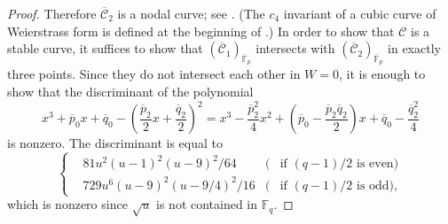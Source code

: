 \documentclass{amsart}
\theoremstyle{definition}
\theoremstyle{remark}
\newcommand{\Fq}{\mathbb F_q}
\newcommand{\Fbar}{\overline{\mathbb F}_p}
\begin{document}
\begin{proof}
Therefore $\overline{\mathscr{C}}_2$ is a nodal curve; see \cite[Chapter III, Proposition 1.4]{Silverman}.
(The $c_4$ invariant of a cubic curve of Weierstrass form is defined at the beginning of \cite[Section III.1]{Silverman}.)
In order to show that $\mathscr{C}$ is a stable curve, it suffices to show that
$(\overline{\mathscr{C}}_1)_{\Fbar}$
intersects
with
$(\overline{\mathscr{C}}_2)_{\Fbar}$
in exactly three points.
Since they do not intersect each other in $W=0$, it is enough to show that
the discriminant of
the polynomial
\begin{equation}\label{equation:intersection}
x^3 + \overline{p}_0 x +  \overline{q}_0 -(\frac{\overline{p}_2}{2} x + \frac{\overline{q}_2}{2})^2=x^3 -\frac{\overline{p}^2_2}{4} x^2 + (\overline{p}_0 - \frac{\overline{p}_2\overline{q}_2}{2})x +  \overline{q}_0 -\frac{\overline{q}^2_2}{4}
\end{equation}
is nonzero.
The discriminant is equal to
\begin{equation}\label{equation:discriminant}
    \left\{
  \begin{aligned}
  & 81u^2(u-1)^2(u-9)^2/64 &  (& \text{if $(q-1)/2$ is even})\\
  & 729u^6(u-9)^2(u-9/4)^2/16 &  (& \text{if $(q-1)/2$ is odd}),
  \end{aligned}
\right.
\end{equation}
which is nonzero since $\sqrt{u}$ is not contained in $\Fq$.
\end{proof}
\end{document}
